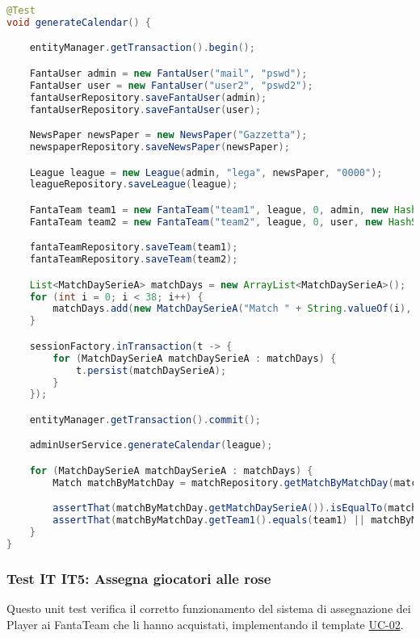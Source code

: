 \begin{lstlisting}[language=Java]
@Test
void generateCalendar() {

	entityManager.getTransaction().begin();

	FantaUser admin = new FantaUser("mail", "pswd");
	FantaUser user = new FantaUser("user2", "pswd2");
	fantaUserRepository.saveFantaUser(admin);
	fantaUserRepository.saveFantaUser(user);

	NewsPaper newsPaper = new NewsPaper("Gazzetta");
	newspaperRepository.saveNewsPaper(newsPaper);

	League league = new League(admin, "lega", newsPaper, "0000");
	leagueRepository.saveLeague(league);

	FantaTeam team1 = new FantaTeam("team1", league, 0, admin, new HashSet<Contract>());
	FantaTeam team2 = new FantaTeam("team2", league, 0, user, new HashSet<Contract>());

	fantaTeamRepository.saveTeam(team1);
	fantaTeamRepository.saveTeam(team2);

	List<MatchDaySerieA> matchDays = new ArrayList<MatchDaySerieA>();
	for (int i = 0; i < 38; i++) {
		matchDays.add(new MatchDaySerieA("Match " + String.valueOf(i), LocalDate.of(2025, 9, 7).plusWeeks(i)));
	}

    sessionFactory.inTransaction(t -> {
		for (MatchDaySerieA matchDaySerieA : matchDays) {
			t.persist(matchDaySerieA);
		}
	});

	entityManager.getTransaction().commit();

    adminUserService.generateCalendar(league);

	for (MatchDaySerieA matchDaySerieA : matchDays) {
		Match matchByMatchDay = matchRepository.getMatchByMatchDay(matchDaySerieA, league, team1);

		assertThat(matchByMatchDay.getMatchDaySerieA()).isEqualTo(matchDaySerieA);
		assertThat(matchByMatchDay.getTeam1().equals(team1) || matchByMatchDay.getTeam2().equals(team1)).isTrue();
	}
}
\end{lstlisting}


\subsubsection{Test IT IT5: Assegna giocatori alle rose} \label{IT5}

Questo unit test verifica il corretto funzionamento del sistema di assegnazione dei Player ai FantaTeam che li hanno acquistati,
implementando il template \hyperref[UC-02]{UC-02}.

